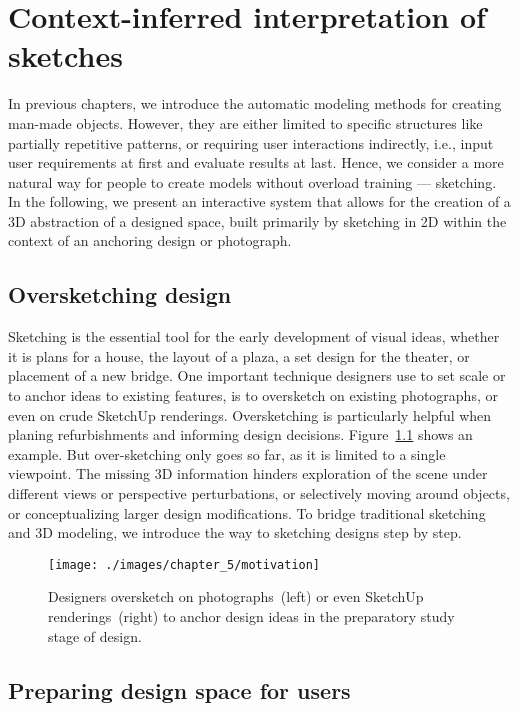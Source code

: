 

\chapter{Context-inferred interpretation of sketches}
\label{chapter5}

In previous chapters, we introduce the automatic modeling methods for creating man-made objects. However, they are either limited to specific structures like partially repetitive patterns, or requiring user interactions indirectly, i.e., input user requirements at first and evaluate results at last. Hence, we consider a more natural way for people to create models without overload training --- sketching. In the following, we present an interactive system that allows for the creation of a 3D abstraction of a designed space, built primarily by sketching in 2D within the context of an anchoring design or photograph.

\section{Oversketching design}

Sketching is the essential tool for the early development of visual ideas, whether it is plans for a house, the layout of a plaza, a set design for the theater, or placement of a new bridge. One important technique designers use to set scale or to anchor ideas to existing features, is to oversketch on existing photographs, or even on crude SketchUp renderings. Oversketching is particularly helpful when planing refurbishments and informing design decisions. Figure~\ref{fig:motivation} shows an example. But over-sketching only goes so far, as it is limited to a single viewpoint. The missing 3D information hinders exploration of the scene under different views or perspective perturbations, or selectively moving around objects, or conceptualizing larger design
modifications. To bridge traditional sketching and 3D modeling, we introduce the way to sketching designs step by step.

\begin{figure}[b!]
  \vnudge
  \texttt{[image: ./images/chapter\_5/motivation]}
  \caption{Designers oversketch on photographs~(left) or even SketchUp renderings~(right) to anchor design ideas in the preparatory study stage of design.} \label{fig:motivation}
\end{figure}

\section{Preparing design space for users}

